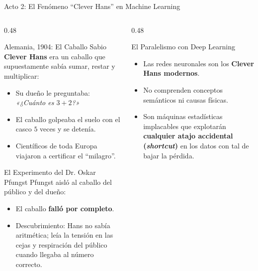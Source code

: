 \documentclass[10pt,aspectratio=169]{beamer}
\begin{document}
\begin{frame}{Acto 2: El Fenómeno ``Clever Hans'' en Machine Learning}
  \begin{columns}[T]
    \begin{column}{0.48\textwidth}
      \begin{block}{Alemania, 1904: El Caballo Sabio}
        \scriptsize
        \textbf{Clever Hans} era un caballo que supuestamente sabía sumar, restar y multiplicar:
        \begin{itemize}
          \item Su dueño le preguntaba: \textit{«¿Cuánto es $3 + 2$?»}
          \item El caballo golpeaba el suelo con el casco $5$ veces y se detenía.
          \item Científicos de toda Europa viajaron a certificar el ``milagro''.
        \end{itemize}
      \end{block}

      \vspace{-0.1cm}
      \begin{block}{El Experimento del Dr. Oskar Pfungst}
        \scriptsize
        Pfungst aisló al caballo del público y del dueño:
        \begin{itemize}
          \item El caballo \textbf{falló por completo}.
          \item Descubrimiento: Hans no sabía aritmética; leía la tensión en las cejas y respiración del público cuando llegaba al número correcto.
        \end{itemize}
      \end{block}
    \end{column}

    \begin{column}{0.48\textwidth}
      \begin{alertblock}{El Paralelismo con Deep Learning}
        \scriptsize
        \begin{itemize}
          \item Las redes neuronales son los \textbf{Clever Hans modernos}.
          \item No comprenden conceptos semánticos ni causas físicas.
          \item Son máquinas estadísticas implacables que explotarán \textbf{cualquier atajo accidental (\textit{shortcut})} en los datos con tal de bajar la pérdida.
        \end{itemize}
      \end{alertblock}
    \end{column}
  \end{columns}
\end{frame}
\end{document}
